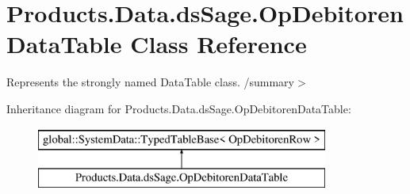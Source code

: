 \hypertarget{class_products_1_1_data_1_1ds_sage_1_1_op_debitoren_data_table}{}\section{Products.\+Data.\+ds\+Sage.\+Op\+Debitoren\+Data\+Table Class Reference}
\label{class_products_1_1_data_1_1ds_sage_1_1_op_debitoren_data_table}


Represents the strongly named Data\+Table class. /summary$>$  


Inheritance diagram for Products.\+Data.\+ds\+Sage.\+Op\+Debitoren\+Data\+Table\+:\begin{figure}[H]
\begin{center}
\leavevmode
\includegraphics[height=2.000000cm]{class_products_1_1_data_1_1ds_sage_1_1_op_debitoren_data_table}
\end{center}
\end{figure}
